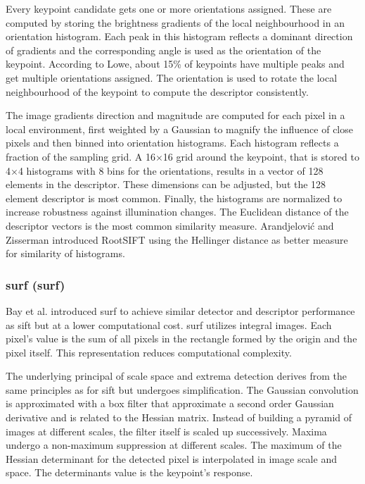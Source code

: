 Every keypoint candidate gets one or more orientations assigned.
These are computed by storing the brightness gradients of the local neighbourhood in an orientation histogram.
Each peak in this histogram reflects a dominant direction of gradients and the corresponding angle is used as the orientation of the keypoint.
According to Lowe\cite{lowe_ijcv04}, about 15\% of keypoints have multiple peaks and get multiple orientations assigned.
The orientation is used to rotate the local neighbourhood of the keypoint to compute the descriptor consistently.

The image gradients direction and magnitude are computed for each pixel in a local environment, first weighted by a Gaussian to magnify the influence of close pixels and then binned into orientation histograms.
Each histogram reflects a fraction of the sampling grid.
A 16$\times$16 grid around the keypoint, that is stored to 4$\times$4 histograms with 8 bins for the orientations, results in a vector of 128 elements in the descriptor.
These dimensions can be adjusted, but the 128 element descriptor is most common.
Finally, the histograms are normalized to increase robustness against illumination changes.
The Euclidean distance of the descriptor vectors is the most common similarity measure.
Arandjelović and Zisserman\cite{arandjelovic_2012} introduced RootSIFT using the Hellinger distance\cite{hellinger_1909} as better measure for similarity of histograms.

\subsubsection{\acrshort{surf} (\acrlong{surf})}

Bay et al. introduced \acrshort{surf}\cite{bay_eccv06} to achieve similar detector and descriptor performance as \acrshort{sift} but at a lower computational cost.
\acrshort{surf} utilizes integral images\cite{viola_cvpr01}.
Each pixel's value is the sum of all pixels in the rectangle formed by the origin and the pixel itself.
This representation reduces computational complexity.

The underlying principal of scale space and extrema detection derives from the same principles as for \acrshort{sift} but undergoes simplification.
The Gaussian convolution is approximated with a box filter that approximate a second order Gaussian derivative and is related to the Hessian matrix.
Instead of building a pyramid of images at different scales, the filter itself is scaled up successively.
Maxima undergo a non-maximum suppression at different scales.
The maximum of the Hessian determinant for the detected pixel is interpolated in image scale and space.
The determinants value is the keypoint's response.

